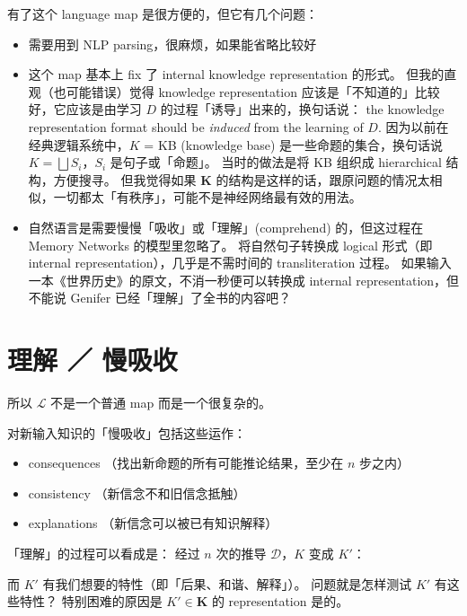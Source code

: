 \documentclass[12pt]{article}
\begin{document}
有了这个 language map 是很方便的，但它有几个问题：
\begin{itemize}

\item 需要用到 NLP parsing，很麻烦，如果能省略比较好

\item 这个 map 基本上 fix 了 internal knowledge representation 的形式。 但我的直观（也可能错误）觉得 knowledge representation 应该是「不知道的」比较好，它应该是由学习 $D$ 的过程「诱导」出来的，换句话说： the knowledge representation format should be \textit{induced} from the learning of $D$.  因为以前在经典逻辑系统中，$K$ = KB (knowledge base) 是一些命题的集合，换句话说 $ K = \bigsqcup S_i $，$S_i$ 是句子或「命题」。  当时的做法是将 KB 组织成 hierarchical 结构，方便搜寻。 但我觉得如果 $\mathbf{K}$ 的结构是这样的话，跟原问题的情况太相似，一切都太「有秩序」，可能不是神经网络最有效的用法。

\item 自然语言是需要慢慢「吸收」或「理解」(comprehend) 的，但这过程在 Memory Networks 的模型里忽略了。  将自然句子转换成 logical 形式（即 internal representation），几乎是不需时间的 transliteration 过程。  如果输入一本《世界历史》的原文，不消一秒便可以转换成 internal representation，但不能说 Genifer 已经「理解」了全书的内容吧？

\end{itemize}

\section{理解 ／ 慢吸收}

所以 $\mathcal{L}$ 不是一个普通 map 而是一个很复杂的。

对新输入知识的「慢吸收」包括这些运作：
\begin{itemize}
\item consequences （找出新命题的所有可能推论结果，至少在 $n$ 步之内）
\item consistency （新信念不和旧信念抵触）
\item explanations （新信念可以被已有知识解释）
\end{itemize}

「理解」的过程可以看成是： 经过 $n$ 次的推导 $\mathcal{D}$，$K$ 变成 $K'$：
\begin{center}
\end{center}
而 $K'$ 有我们想要的特性（即「后果、和谐、解释」）。  问题就是怎样测试 $K'$ 有这些特性？  特别困难的原因是 $K' \in \mathbf{K}$ 的 representation 是的。
\end{document}
